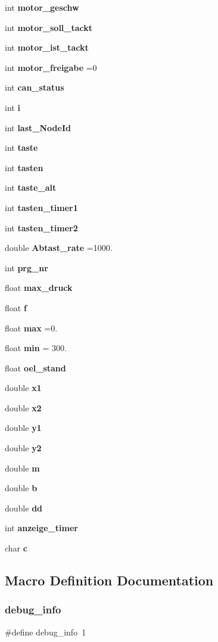 \begin{DoxyCompactItemize}
\item 
int \textbf{ motor\+\_\+geschw}
\item 
int \textbf{ motor\+\_\+soll\+\_\+tackt}
\item 
int \textbf{ motor\+\_\+ist\+\_\+tackt}
\item 
int \textbf{ motor\+\_\+freigabe} =0
\item 
int \textbf{ can\+\_\+status}
\item 
int \textbf{ i}
\item 
int \textbf{ last\+\_\+\+Node\+Id}
\item 
int \textbf{ taste}
\item 
int \textbf{ tasten}
\item 
int \textbf{ taste\+\_\+alt}
\item 
int \textbf{ tasten\+\_\+timer1}
\item 
int \textbf{ tasten\+\_\+timer2}
\item 
double \textbf{ Abtast\+\_\+rate} =1000.
\item 
int \textbf{ prg\+\_\+nr}
\item 
float \textbf{ max\+\_\+druck}
\item 
float \textbf{ f}
\item 
float \textbf{ max} =0.
\item 
float \textbf{ min} = 300.
\item 
float \textbf{ oel\+\_\+stand}
\item 
double \textbf{ x1}
\item 
double \textbf{ x2}
\item 
double \textbf{ y1}
\item 
double \textbf{ y2}
\item 
double \textbf{ m}
\item 
double \textbf{ b}
\item 
double \textbf{ dd}
\item 
int \textbf{ anzeige\+\_\+timer}
\item 
char \textbf{ c}
\end{DoxyCompactItemize}


\subsection{Macro Definition Documentation}
\mbox{\label{main_8c_a84665051b0af694acfe71d9eb21b75e0}} 
\subsubsection{debug\+\_\+info}
{\footnotesize\ttfamily \#define debug\+\_\+info~1}



